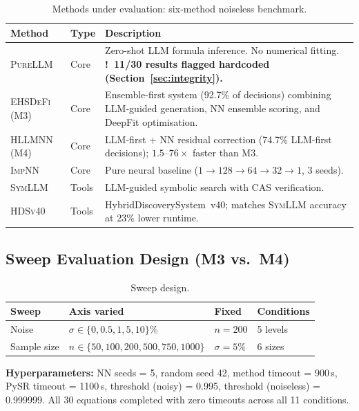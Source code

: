 \documentclass[twoside,11pt]{article}
\newcommand{\PureLLM}{\textsc{PureLLM}}
\newcommand{\INN}{\textsc{ImpNN}}
\newcommand{\EHD}{\textsc{EHSDeFi}}
\newcommand{\HSL}{\textsc{HLLMNN}}
\newcommand{\SEL}{\textsc{SymLLM}}
\newcommand{\HDS}{\textsc{HDSv40}}
\newcommand{\warn}{{\color{warnAmber}\textbf{!}}}
\begin{document}
\begin{table}[ht]
\caption{Methods under evaluation: six-method noiseless benchmark.}
\label{tab:methods}
\centering
\small
\renewcommand{\arraystretch}{1.3}
\begin{tabular}{L{2.1cm} L{1.3cm} L{8.0cm}}
\toprule
\textbf{Method} & \textbf{Type} & \textbf{Description} \\
\midrule
{}
\PureLLM & Core &
  Zero-shot LLM formula inference.  No numerical fitting.
  \textbf{\warn~11/30 results flagged hardcoded (Section~\ref{sec:integrity}).} \\
\EHD\,(M3) & Core &
  Ensemble-first system (92.7\% of decisions) combining LLM-guided generation,
  NN ensemble scoring, and DeepFit optimisation. \\
\HSL\,(M4) & Core &
  LLM-first + NN residual correction (74.7\% LLM-first decisions);
  $1.5$--$76\times$ faster than M3. \\
\INN & Core &
  Pure neural baseline ($1\!\to\!128\!\to\!64\!\to\!32\!\to\!1$, 3 seeds). \\
\SEL & Tools &
  LLM-guided symbolic search with CAS verification. \\
\HDS & Tools &
  HybridDiscoverySystem~v40; matches \SEL{} accuracy at 23\% lower runtime. \\
\bottomrule
\end{tabular}
\end{table}

\subsection{Sweep Evaluation Design (M3 vs.\ M4)}
\label{sec:methods:sweep}

\begin{table}[ht]
\centering
\caption{Sweep design.}
\label{tab:sweeps}
\begin{tabular}{L{2.5cm} L{4.3cm} L{2.5cm} C{2.0cm}}
\toprule
\textbf{Sweep} & \textbf{Axis varied} & \textbf{Fixed} & \textbf{Conditions}\\
\midrule
Noise       & $\sigma \in \{0, 0.5, 1, 5, 10\}\%$ & $n=200$       & 5 levels \\
Sample size & $n \in \{50,100,200,500,750,1000\}$  & $\sigma=5\%$ & 6 sizes  \\
\bottomrule
\end{tabular}
\end{table}

\noindent\textbf{Hyperparameters:} NN seeds = 5, random seed 42,
method timeout = 900\,s, PySR timeout = 1100\,s,
threshold (noisy) = 0.995, threshold (noiseless) = 0.999999.
All 30 equations completed with zero timeouts across all 11 conditions.
\end{document}

